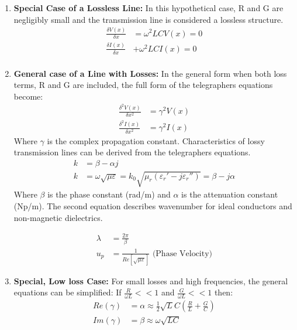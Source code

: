 \documentclass{book}
\begin{document}
\begin{enumerate}
	\item \textbf{Special Case of a Lossless Line:} In this hypothetical case, R and G are negligibly small and the transmission line is considered a lossless structure.
	\begin{align*}
		\frac{\delta V(x)}{\delta x} &= \omega^2 L C V(x) = 0 \\
		\frac{\delta I(x)}{\delta x} &+ \omega^2 L C I(x) = 0 \\
	\end{align*}
	
	\item \textbf{General case of a Line with Losses:} In the general form when both loss terms, R and G are included, the full form of the telegraphers equations become:
	\begin{align*}
		\frac{\delta^2 V(x)}{\delta x^2} &= \gamma^2V(x) \\
		\frac{\delta^2 I(x)}{\delta x^2} &= \gamma^2I(x) 
	\end{align*}
	Where \(\gamma\) is the complex propagation constant. Characteristics of lossy transmission lines can be derived from the telegraphers equations.
	\begin{align*}
		k &= \beta - \alpha j \\
		k &= \omega \sqrt{\mu \varepsilon} = k_0 \sqrt{\mu_r (\varepsilon_r' - j\varepsilon_r'')} = \beta - j \alpha 
	\end{align*}
	Where $\beta$ is the phase constant (rad/m) and $\alpha$ is the attenuation constant (Np/m). The second equation describes wavenumber for ideal conductors and non-magnetic dielectrics.
	
	\begin{align*}
		\lambda &= \frac{2\pi}{\beta} \\
		u_p &= \frac{1}{Re[\sqrt{\mu \varepsilon}]} \text{ (Phase Velocity)}
	\end{align*}	
	\item \textbf{Special, Low loss Case:}  For small losses and high frequencies, the general equations can be simplified: If $\frac{R}{\omega L} << 1$ and $\frac{G}{\omega L} << 1$ then:
	\begin{align*}
		Re(\gamma) &= \alpha \approx \frac{1}{2} \sqrt{L}{C} (\frac{R}{L} + \frac{G}{C}) \\
		Im(\gamma) &= \beta \approx \omega \sqrt{LC}
	\end{align*}
\end{enumerate}
\end{document}
